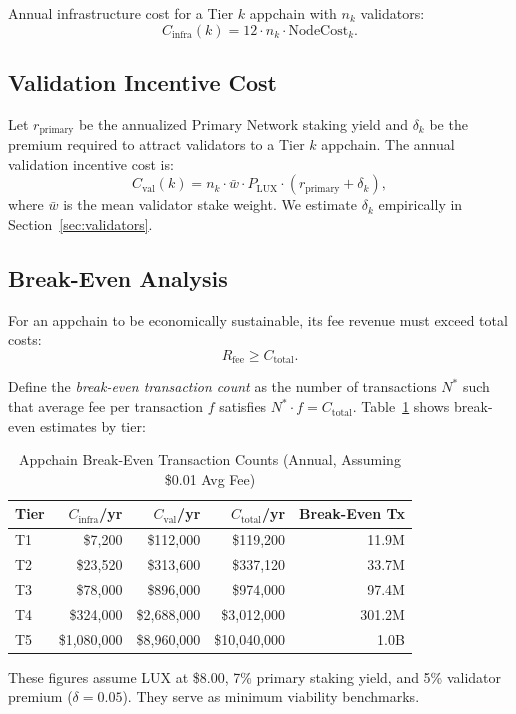 Annual infrastructure cost for a Tier $k$ appchain with $n_k$ validators:
\[
  C_{\text{infra}}(k) = 12 \cdot n_k \cdot \text{NodeCost}_k.
\]

\subsection{Validation Incentive Cost}

Let $r_{\text{primary}}$ be the annualized Primary Network staking yield and $\delta_k$
be the premium required to attract validators to a Tier $k$ appchain. The annual
validation incentive cost is:
\[
  C_{\text{val}}(k) = n_k \cdot \bar{w} \cdot P_{\text{LUX}} \cdot (r_{\text{primary}} + \delta_k),
\]
where $\bar{w}$ is the mean validator stake weight. We estimate $\delta_k$ empirically
in Section~\ref{sec:validators}.

\subsection{Break-Even Analysis}

For an appchain to be economically sustainable, its fee revenue must exceed total costs:
\[
  R_{\text{fee}} \geq C_{\text{total}}.
\]

Define the \emph{break-even transaction count} as the number of transactions $N^*$
such that average fee per transaction $f$ satisfies $N^* \cdot f = C_{\text{total}}$.
Table~\ref{tab:breakeven} shows break-even estimates by tier:

\begin{table}[H]
\centering
\caption{Appchain Break-Even Transaction Counts (Annual, Assuming \$0.01 Avg Fee)}
\label{tab:breakeven}
\begin{tabular}{lrrrr}
\toprule
\textbf{Tier} & \textbf{$C_\text{infra}$/yr} & \textbf{$C_\text{val}$/yr} & \textbf{$C_\text{total}$/yr} & \textbf{Break-Even Tx} \\
\midrule
T1 & \$7,200 & \$112,000 & \$119,200 & 11.9M \\
T2 & \$23,520 & \$313,600 & \$337,120 & 33.7M \\
T3 & \$78,000 & \$896,000 & \$974,000 & 97.4M \\
T4 & \$324,000 & \$2,688,000 & \$3,012,000 & 301.2M \\
T5 & \$1,080,000 & \$8,960,000 & \$10,040,000 & 1.0B \\
\bottomrule
\end{tabular}
\end{table}

These figures assume LUX at \$8.00, 7\% primary staking yield, and 5\% validator premium
($\delta = 0.05$). They serve as minimum viability benchmarks.

